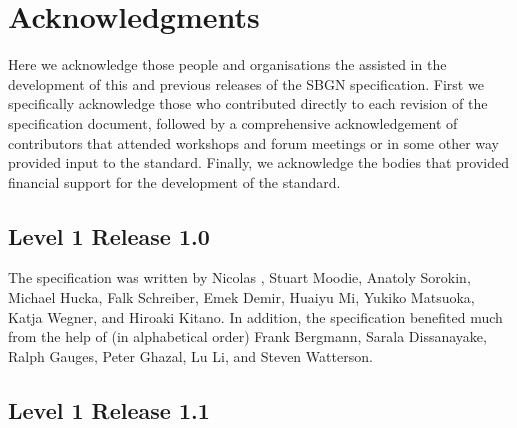 \chapter{Acknowledgments}\label{sec:acknowledgments}

Here we acknowledge those people and organisations the assisted in the development of this and previous releases of the SBGN \PDl specification. First we specifically acknowledge those who contributed directly to each revision of the  specification document, followed by a comprehensive acknowledgement of contributors that attended workshops and forum meetings or in some other way provided input to the standard. Finally, we acknowledge the bodies that provided financial support for the development of the standard.



\section{Level 1 Release 1.0}

The specification was written by Nicolas \lenov{}, 
Stuart Moodie, Anatoly Sorokin, Michael Hucka, Falk Schreiber, Emek Demir, 
Huaiyu Mi, Yukiko Matsuoka, Katja Wegner, and Hiroaki Kitano. In addition, 
the specification benefited much from the help of (in alphabetical order) Frank Bergmann, Sarala 
Dissanayake, Ralph Gauges, Peter Ghazal, Lu Li, and Steven Watterson.


\section{Level 1 Release 1.1}

